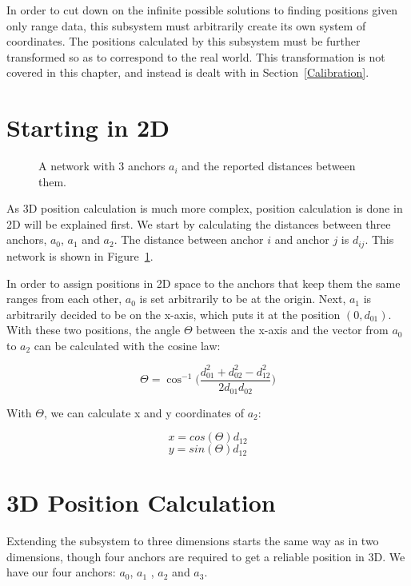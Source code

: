 In order to cut down on the infinite possible solutions to finding positions given only range data, this subsystem must arbitrarily create its own system of coordinates. The positions calculated by this subsystem must be further transformed so as to correspond to the real world. This transformation is not covered in this chapter, and instead is dealt with in Section~\ref{Calibration}.

\section{Starting in 2D}
\label{HighLevelExample}

\begin{figure}
	\centering
	
	\decoRule
	\caption{A network with 3 anchors $a_i$ and the reported distances between them.}
	\label{fig:PositionCalculationNetwork}
\end{figure}

As 3D position calculation is much more complex, position calculation is done in 2D will be explained first. We start by calculating the distances between three anchors, $a_{0}$, $ a_{1}$  and $a_{2}$. The distance between anchor $i$ and anchor $j$ is $d_{ij}$. This network is shown in Figure~\ref{fig:PositionCalculationNetwork}.

In order to assign positions in 2D space to the anchors that keep them the same ranges from each other, $a_{0}$ is set arbitrarily to be at the origin. Next, $a_{1}$ is arbitrarily decided to be on the x-axis, which puts it at the position $(0, d_{01})$. With these two positions, the angle $\Theta$ between the x-axis and the vector from $a_0$ to $a_2$ can be calculated with the cosine law:

\[ \Theta = \cos ^{-1}\Big(\frac{d_{01}^2 + d_{02}^2 - d_{12}^2 }{2 d_{01} d_{02}}\Big)\]

With $\Theta$, we can calculate x and y coordinates of $a_2$:

\[ x = cos(\Theta) d_{12} \]
\[ y = sin(\Theta) d_{12} \]

\section{3D Position Calculation}
Extending the subsystem to three dimensions starts the same way as in two dimensions, though four anchors are required to get a reliable position in 3D. We have our four anchors: $a_{0}$, $a_{1}$ , $a_{2}$ and $a_{3}$. 

